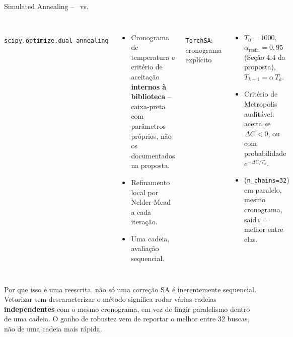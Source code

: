 \begin{frame}{Simulated Annealing -- \antes\ vs. \depois}
  \begin{columns}[T,onlytextwidth]
      \antes\\[0.3em]
      \small \texttt{scipy.optimize.dual\_annealing}
      \begin{itemize}\footnotesize
        \item Cronograma de temperatura e critério de aceitação
          \textbf{internos à biblioteca} -- caixa-preta com parâmetros
          próprios, não os documentados na proposta.
        \item Refinamento local por Nelder-Mead a cada iteração.
        \item Uma cadeia, avaliação sequencial.
      \end{itemize}
      \depois\\[0.3em]
      \small \texttt{TorchSA}: cronograma explícito
      \begin{itemize}\footnotesize
        \item $T_0=1000$, $\alpha_{\text{resfr.}}=0{,}95$ (Seção 4.4 da
          proposta), $T_{k+1}=\alpha\, T_k$.
        \item Critério de Metropolis auditável: aceita se $\Delta C<0$, ou
          com probabilidade $e^{-\Delta C/T_k}$.
        \item {} (\texttt{n\_chains=32})
          em paralelo, mesmo cronograma, saída = melhor entre elas.
      \end{itemize}
  \end{columns}
  \vspace{0.8em}

  \begin{block}{Por que isso é uma reescrita, não só uma correção}
    \small SA é inerentemente sequencial. Vetorizar sem descaracterizar o
    método significa rodar várias cadeias \textbf{independentes} com o
    mesmo cronograma, em vez de fingir paralelismo dentro de uma cadeia.
    O ganho de robustez vem de reportar o melhor entre 32 buscas, não de
    uma cadeia mais rápida.
  \end{block}

\end{frame}
